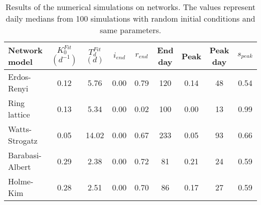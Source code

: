 \begin{table}[h]
\centering
\caption{Results of the numerical simulations on networks. The values represent daily medians from 100 simulations with random initial conditions and same parameters.}
\label{tab:results}
\begin{tabular}{lcccccccc}
\toprule
   Network model & $K_0^{Fit}$ $(d^{-1})$ & $T_d^{Fit}$ $(d)$ & $i_{end}$ & $r_{end}$ & End day & Peak  & Peak day & $s_{peak}$\\
\midrule
 Erdos-Renyi 			&    0.12 &   5.76 &  0.00 &  0.79 &    120 &  0.14 &   48 & 0.54 \\
 Ring lattice 		&    0.13 &   5.34 &  0.00 &  0.02 &  	100 &  0.00 &   13 & 0.99 \\
 Watts-Strogatz 	&    0.05 &  14.02 &  0.00 &  0.67 &    233 &  0.05 &   93 & 0.66 \\
 Barabasi-Albert 	&    0.29 &   2.38 &  0.00 &  0.72 &  	 81 &  0.21 &   24 & 0.59 \\
 Holme-Kim 				&    0.28 &   2.51 &  0.00 &  0.70 &  	 86 &  0.17 &   27 & 0.59 \\

 
\bottomrule
\end{tabular}
\end{table}
